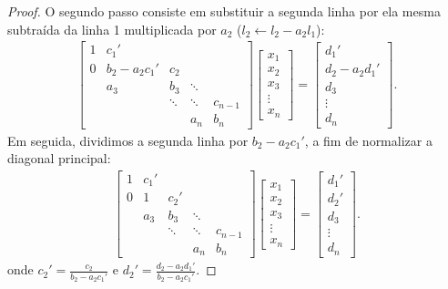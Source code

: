 \begin{proof}
O segundo passo consiste em substituir a segunda linha por ela mesma subtraída da linha 1 multiplicada por $a_2$ ($l_2\leftarrow l_2-a_2l_1$):
\begin{eqnarray} \begin{bmatrix}
   {1} & {c_1'} & {   } & {   } & {   } \\
   {0} & {b_2-a_2c_1'} & {c_2} & {   } & {   } \\
   {   } & {a_3} & {b_3} & \ddots & {   } \\
   {   } & {   } & \ddots & \ddots & {c_{n-1}}\\
   {   } & {   } & {   } & {a_n} & {b_n}
\end{bmatrix}
\begin{bmatrix}
   {x_1 }  \\
   {x_2 }  \\
   {x_3 }  \\
   \vdots   \\
   {x_n }
\end{bmatrix}
=
\begin{bmatrix}
   {d_1' }  \\
   {d_2 -a_2d_1' }  \\
   {d_3 }  \\
   \vdots   \\
   {d_n }
\end{bmatrix}.
\end{eqnarray}
Em seguida, dividimos a segunda linha por $b_2-a_2c_1'$, a fim de normalizar a diagonal principal:
\begin{eqnarray} \begin{bmatrix}
   {1} & {c_1'} & {   } & {   } & {   } \\
   {0} & {1} & {c_2'} & {   } & {   } \\
   {   } & {a_3} & {b_3} & \ddots & {   } \\
   {   } & {   } & \ddots & \ddots & {c_{n-1}}\\
   {   } & {   } & {   } & {a_n} & {b_n}
\end{bmatrix}
\begin{bmatrix}
   {x_1 }  \\
   {x_2 }  \\
   {x_3 }  \\
   \vdots   \\
   {x_n }
\end{bmatrix}
=
\begin{bmatrix}
   {d_1' }  \\
   {d_2' }  \\
   {d_3 }  \\
   \vdots   \\
   {d_n }
\end{bmatrix}.
\end{eqnarray}
onde $c_2'=\frac{c_2}{b_2-a_2c_1'}$ e $d_2'=\frac{d_2 -a_2d_1'}{b_2-a_2c_1'}$.


\end{proof}
